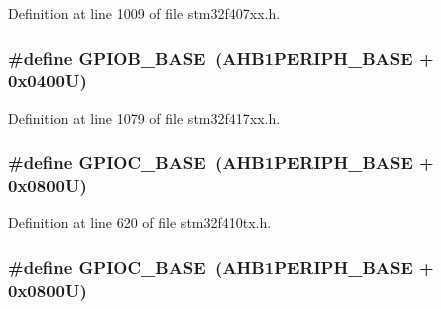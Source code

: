 Definition at line 1009 of file stm32f407xx.\+h.

\subsubsection[{\texorpdfstring{G\+P\+I\+O\+B\+\_\+\+B\+A\+SE}{GPIOB_BASE}}]{\setlength{\rightskip}{0pt plus 5cm}\#define G\+P\+I\+O\+B\+\_\+\+B\+A\+SE~({\bf A\+H\+B1\+P\+E\+R\+I\+P\+H\+\_\+\+B\+A\+SE} + 0x0400\+U)}\hypertarget{group___peripheral__registers__structures_gac944a89eb789000ece920c0f89cb6a68}{}\label{group___peripheral__registers__structures_gac944a89eb789000ece920c0f89cb6a68}


Definition at line 1079 of file stm32f417xx.\+h.

\subsubsection[{\texorpdfstring{G\+P\+I\+O\+C\+\_\+\+B\+A\+SE}{GPIOC_BASE}}]{\setlength{\rightskip}{0pt plus 5cm}\#define G\+P\+I\+O\+C\+\_\+\+B\+A\+SE~({\bf A\+H\+B1\+P\+E\+R\+I\+P\+H\+\_\+\+B\+A\+SE} + 0x0800\+U)}\hypertarget{group___peripheral__registers__structures_ga26f267dc35338eef219544c51f1e6b3f}{}\label{group___peripheral__registers__structures_ga26f267dc35338eef219544c51f1e6b3f}


Definition at line 620 of file stm32f410tx.\+h.

\subsubsection[{\texorpdfstring{G\+P\+I\+O\+C\+\_\+\+B\+A\+SE}{GPIOC_BASE}}]{\setlength{\rightskip}{0pt plus 5cm}\#define G\+P\+I\+O\+C\+\_\+\+B\+A\+SE~({\bf A\+H\+B1\+P\+E\+R\+I\+P\+H\+\_\+\+B\+A\+SE} + 0x0800\+U)}\hypertarget{group___peripheral__registers__structures_ga26f267dc35338eef219544c51f1e6b3f}{}\label{group___peripheral__registers__structures_ga26f267dc35338eef219544c51f1e6b3f}


